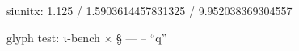 \documentclass{article}
\begin{document}
siunitx: \num[round-mode=places,round-precision=2]{1.125} /
\num[round-mode=places,round-precision=2]{1.5903614457831325} /
\num[round-mode=places,round-precision=1]{9.952038369304557}

glyph test: τ-bench × § — – “q”
\end{document}

